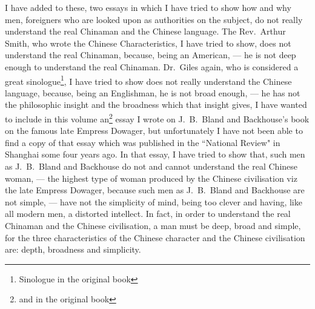 I have added to these, two essays in which I have tried to show how and why men, foreigners who are looked upon as authorities on the subject, do not really understand the real Chinaman and the Chinese language.
The Rev.~Arthur Smith,  who wrote the Chinese Characteristics, I have tried to show, does not understand the real Chinaman, because, being an American, --- he is not deep enough to understand the real Chinaman.
Dr.~Giles  again, who is considered a great sinologue\footnote{Sinologue in the original book}, I have tried to show does not really understand the Chinese language, because, being an Englishman, he is not broad enough, --- he has not the philosophic insight and the broadness which that insight gives, I have wanted to include in this volume an\footnote{and in the original book} essay I wrote on J.~B.~Bland  and Backhouse's  book on the famous late Empress Dowager,  but unfortunately I have not been able to find a copy of that essay which was published in the ``National Review" in Shanghai some four years ago.
In that essay, I have tried to show that, such men as J.~B.~Bland and Backhouse do not and cannot understand the real Chinese woman, --- the highest type of woman produced by the Chinese civilisation viz the late Empress Dowager, because such men as J.~B.~Bland and Backhouse are not simple, --- have not the simplicity of mind, being too clever and having, like all modern men, a distorted intellect\cite{num1}. 
In fact, in order to understand the real Chinaman and the Chinese civilisation, a man must be deep, broad and simple, for the three characteristics of the Chinese character and the Chinese civilisation are: depth, broadness and simplicity.

